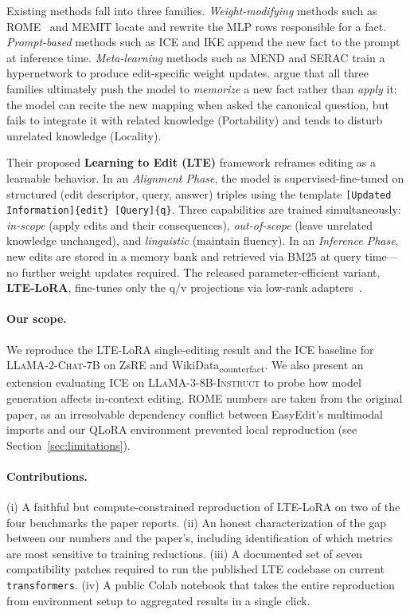 \documentclass[11pt,a4paper,twocolumn]{article}
\begin{document}
Existing methods fall into three families. \emph{Weight-modifying} methods such as ROME~\citep{meng2022locating} and MEMIT locate and rewrite the MLP rows responsible for a fact. \emph{Prompt-based} methods such as ICE and IKE append the new fact to the prompt at inference time. \emph{Meta-learning} methods such as MEND and SERAC train a hypernetwork to produce edit-specific weight updates. \citet{jiang2024learning} argue that all three families ultimately push the model to \emph{memorize} a new fact rather than \emph{apply} it: the model can recite the new mapping when asked the canonical question, but fails to integrate it with related knowledge (Portability) and tends to disturb unrelated knowledge (Locality).

Their proposed \textbf{Learning to Edit (LTE)} framework reframes editing as a learnable behavior. In an \emph{Alignment Phase}, the model is supervised-fine-tuned on structured (edit descriptor, query, answer) triples using the template \texttt{[Updated Information]\{edit\} [Query]\{q\}}. Three capabilities are trained simultaneously: \emph{in-scope} (apply edits and their consequences), \emph{out-of-scope} (leave unrelated knowledge unchanged), and \emph{linguistic} (maintain fluency). In an \emph{Inference Phase}, new edits are stored in a memory bank and retrieved via BM25 at query time---no further weight updates required. The released parameter-efficient variant, \textbf{LTE-LoRA}, fine-tunes only the q/v projections via low-rank adapters~\citep{hu2021lora}.

\paragraph{Our scope.} We reproduce the LTE-LoRA single-editing result and the ICE baseline for \textsc{LLaMA-2-Chat-7B} on ZsRE and WikiData\textsubscript{counterfact}. We also present an extension evaluating ICE on \textsc{LLaMA-3-8B-Instruct} to probe how model generation affects in-context editing. ROME numbers are taken from the original paper, as an irresolvable dependency conflict between EasyEdit's multimodal imports and our QLoRA environment prevented local reproduction (see Section~\ref{sec:limitations}).

\paragraph{Contributions.} (i) A faithful but compute-constrained reproduction of LTE-LoRA on two of the four benchmarks the paper reports. (ii) An honest characterization of the gap between our numbers and the paper's, including identification of which metrics are most sensitive to training reductions. (iii) A documented set of seven compatibility patches required to run the published LTE codebase on current \texttt{transformers}. (iv) A public Colab notebook that takes the entire reproduction from environment setup to aggregated results in a single click.
\end{document}
